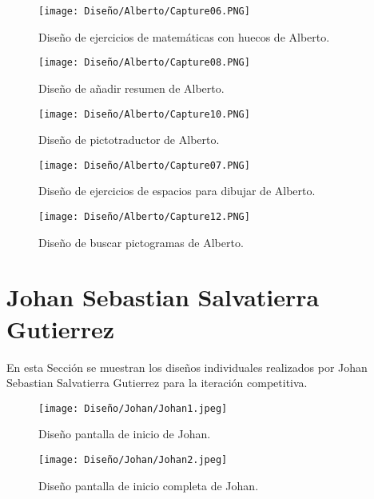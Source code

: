 \begin{figure}[ht!]
  \centering
  \texttt{[image: Diseño/Alberto/Capture06.PNG]}
  \caption{Diseño de ejercicios de matemáticas con huecos de Alberto.}
  \label{Alberto6}
\end{figure}

\begin{figure}[ht!]
  \centering
  \texttt{[image: Diseño/Alberto/Capture08.PNG]}
  \caption{Diseño de añadir resumen de Alberto.}
  \label{Alberto8}
\end{figure}

\begin{figure}[ht!]
  \centering
  \texttt{[image: Diseño/Alberto/Capture10.PNG]}
  \caption{Diseño de pictotraductor de Alberto.}
  \label{Alberto10}
\end{figure}

\begin{figure}[ht!]
  \centering
  \texttt{[image: Diseño/Alberto/Capture07.PNG]}
  \caption{Diseño de ejercicios de espacios para dibujar de Alberto.}
  \label{Alberto7}
\end{figure}

\begin{figure}[ht!]
  \centering
  \texttt{[image: Diseño/Alberto/Capture12.PNG]}
  \caption{Diseño de buscar pictogramas de Alberto.}
  \label{Alberto12}
\end{figure}







\section{Johan Sebastian Salvatierra Gutierrez}
\label{sec:disenyoJohan}
En esta Sección se muestran los diseños individuales realizados por Johan Sebastian Salvatierra Gutierrez para la iteración competitiva.

\begin{figure}[ht!]
  \centering
  \texttt{[image: Diseño/Johan/Johan1.jpeg]}
  \caption{Diseño pantalla de inicio de Johan.}
  \label{Johan1}
\end{figure}

\begin{figure}[ht!]
  \centering
  \texttt{[image: Diseño/Johan/Johan2.jpeg]}
  \caption{Diseño pantalla de inicio completa de Johan.}
  \label{Johan2}
\end{figure}

